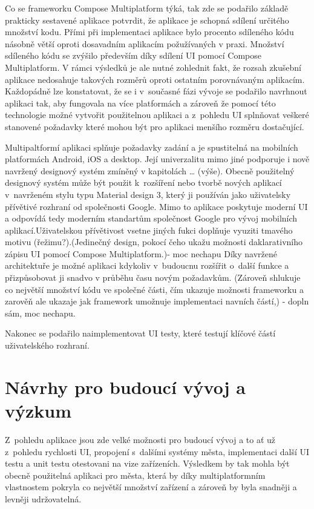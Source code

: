 Co se frameworku Compose Multiplatform týká, tak zde se podařilo základě prakticky sestavené aplikace potvrdit, že aplikace je schopná 
sdílení určitého množství kodu. Přími při implementaci aplikace bylo procento sdíleného kódu násobně větší oproti dosavadním aplikacím
požužívaných v praxi. Množství sdíleného kódu se zvýšilo především díky sdílení UI pomocí Compose Multiplatform. 
V rámci výsledků je ale nutné zohlednit fakt, že rozsah zkušební aplikace nedosahuje 
takových rozměrů oproti ostatním porovnávaným aplikacím. Každopádně lze konstatovat, že se i v~současné fázi vývoje se podařilo navrhnout
aplikaci tak, aby fungovala na více platformách a zároveň že pomocí této technologie možné vytvořit použitelnou aplikaci a z~pohledu UI 
splnňovat veškeré stanovené požadavky které mohou být pro aplikaci menšího rozměru dostačující.

\bigskip

Multipaltformí aplikaci splňuje požadavky zadání a je spustitelná na mobilních platformách Android, iOS a desktop. Její univerzalitu 
mimo jiné podporuje i nově navržený designový systém zmíněný v kapitolách … (výše). Obecně použitelný designový systém může být použit
 k~rozšíření nebo tvorbě nových aplikací v~navrženém stylu typu Material design 3, který ji používán jako uživatelsky přívětivé rozhraní 
 od společnosti Google. Mimo to aplikace poskytuje moderní UI a odpovídá tedy moderním standartům společnost Google pro vývoj mobilních 
 aplikací.Uživatelskou přívětivost vsetne jiných fukci doplňuje vyuziti tmavého motivu (řežimu?).(Jedinečný design, pokocí čeho ukažu 
 možnosti daklarativního zápisu UI pomocí Compose Multiplatform.)- moc nechapu
Díky navržené architektuře je možné aplikaci kdykoliv v~budoucnu rozšířit o~další funkce a přizpůsobovat ji snadvo v průběhu času novým 
požadavkům. (Zároveň shlukuje co největší množství kódu ve společné části, čím ukazuje možnosti frameworku a zarověň ale ukazaje jak 
framework umožnuje implementaci navních částí,) - dopln sám, moc nechapu.

Nakonec se podařilo naimplementovat UI testy, které testují klíčové částí uživatelského rozhraní. 



\section{Návrhy pro budoucí vývoj a výzkum}
Z~pohledu aplikace jsou zde velké možnosti pro budoucí vývoj a to ať už z~pohledu rychlosti UI, propojení s~dalšími systémy města, 
implementaci další UI testu a unit testu otestovani na vize zařízeních. Výsledkem by tak mohla být obecně použitelná aplikaci pro města,
která by díky multiplatformním vlastnostem pokryla co největší množství zařízení a zároveň by byla snadněji a levněji udržovatelná.


